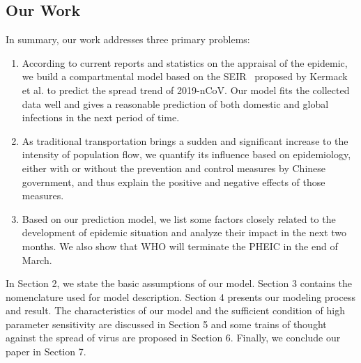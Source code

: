 \documentclass[12pt]{mcmthesis}
\begin{document}
\subsection{Our Work}
In summary, our work addresses three primary problems:
\begin{enumerate}
    \item According to current reports and statistics on the appraisal of the epidemic, we build a compartmental model based on the SEIR~\cite{SI_model_origin} proposed by Kermack et al. to predict the spread trend of 2019-nCoV. Our model fits the collected data well and gives a reasonable prediction of both domestic and global infections in the next period of time.
    \item As traditional transportation brings a sudden and significant increase to the intensity of population flow, we quantify its influence based on epidemiology, either with or without the prevention and control measures by Chinese government, and thus explain the positive and negative effects of those measures.
    \item Based on our prediction model, we list some factors closely related to the development of epidemic situation and analyze their impact in the next two months. We also show that WHO will terminate the PHEIC in the end of March. 
\end{enumerate}

In Section 2, we state the basic assumptions of our model. Section 3 contains the nomenclature used for model description. Section 4 presents our modeling process and result. The characteristics of our model and the sufficient condition of high parameter sensitivity are discussed in Section 5 and some trains of thought against the spread of virus are proposed in Section 6. Finally, we conclude our paper in Section 7.
\end{document}
